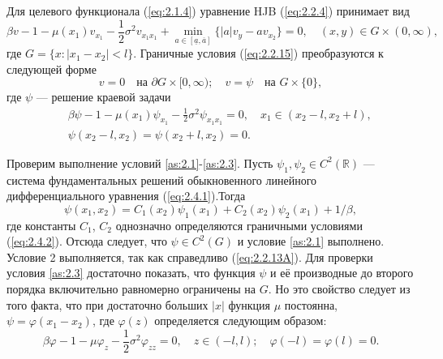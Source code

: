 Для целевого функционала (\ref{eq:2.1.4}) уравнение HJB (\ref{eq:2.2.4}) принимает вид
$$ \beta v-1-\mu(x_1)v_{x_1}-\frac{1}{2}\sigma^2 v_{x_1 x_1}+\min_{a\in [\underline a,\overline a]}\{|a| v_y-a v_{x_2}\}=0,\quad
 (x,y)\in G\times (0,\infty), $$
где $G=\{x:|x_1-x_2|<l\}$. Граничные условия (\ref{eq:2.2.15}) преобразуются к следующей форме
$$ v=0\quad \textrm{на } \partial G\times [0,\infty);\quad v=\psi\quad \textrm{на } G\times\{0\},$$
где $\psi$ --- решение краевой задачи
\begin{eqnarray}
&&\beta \psi-1-\mu(x_1)\psi_{x_1}-\frac{1}{2}\sigma^2 \psi_{x_1 x_1}=0,\quad x_1\in (x_2-l,x_2+l),\label{eq:2.4.1}\\
&&\psi(x_2-l,x_2)=\psi(x_2+l,x_2)=0.\label{eq:2.4.2}
\end{eqnarray}

Проверим выполнение условий \ref{as:2.1}-\ref{as:2.3}. Пусть $\psi_1, \psi_2\in C^2(\mathbb R)$ --- система фундаментальных решений обыкновенного линейного дифференциального уравнения (\ref{eq:2.4.1}).Тогда
$$ \psi(x_1,x_2)=C_1(x_2)\psi_1(x_1)+C_2(x_2)\psi_2(x_1)+1/\beta, $$
где константы $C_1$, $C_2$ однозначно определяются граничными условиями (\ref{eq:2.4.2}). Отсюда следует, что $\psi\in C^2(G)$ и условие \ref{as:2.1} выполнено. Условие 2 выполняется, так как справедливо (\ref{eq:2.2.13A}). Для проверки условия \ref{as:2.3} достаточно показать, что функция $\psi$ и её производные до второго порядка включительно равномерно ограничены на $G$. Но это свойство следует из того факта, что при достаточно больших $|x|$ функция $\mu$ постоянна, $\psi=\varphi(x_1-x_2)$, где $\varphi(z)$ определяется следующим образом:
$$\beta \varphi-1-\mu\varphi_z-\frac{1}{2}\sigma^2 \varphi_{zz}=0,\quad z\in (-l,l);\quad \varphi(-l)=\varphi(l)=0.$$

